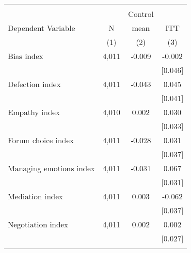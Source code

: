 \begin{tabular}{lccc}
\hline \noalign{\smallskip} &  &  & \\
 &  & Control & \\
Dependent Variable & N & mean & ITT\\
 & (1) & (2) & (3)\\
\noalign{\smallskip}\hline \noalign{\smallskip}Bias index & 4,011 & -0.009 & -0.002\\
 &  &  & [0.046]\\
Defection index & 4,011 & -0.043 & 0.045\\
 &  &  & [0.041]\\
Empathy index & 4,010 & 0.002 & 0.030\\
 &  &  & [0.033]\\
Forum choice index & 4,011 & -0.028 & 0.031\\
 &  &  & [0.037]\\
Managing emotions index & 4,011 & -0.031 & 0.067\\
 &  &  & [0.031]\\
Mediation index & 4,011 & 0.003 & -0.062\\
 &  &  & [0.037]\\
Negotiation index & 4,011 & 0.002 & 0.002\\
 &  &  & [0.027]\\
\noalign{\smallskip}\hline\end{tabular}
